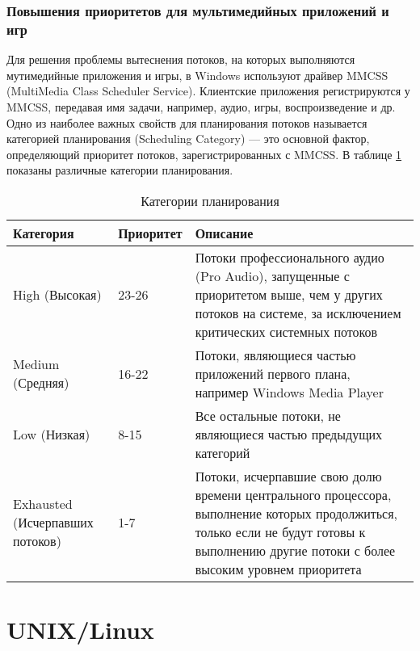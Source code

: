 \subsubsection*{Повышения приоритетов для мультимедийных приложений и игр}

Для решения проблемы вытеснения потоков, на которых выполняются мутимедийные приложения и игры, в Windows используют драйвер MMCSS (MultiMedia Class Scheduler Service). 
Клиентские приложения регистрируются у MMCSS, передавая имя задачи, например, аудио, игры, воспроизведение и др.  
Одно из наиболее важных свойств для планирования потоков называется категорией планирования (Scheduling Category) --- это основной фактор, определяющий приоритет потоков, зарегистрированных с MMCSS.
В таблице \ref{tbl:plan} показаны различные категории планирования.

\begin{table}[ht]
	\begin{center}
		\begin{threeparttable}
			\caption{Категории планирования}
			\label{tbl:plan}
			\begin{tabular}{|p{40mm}|p{30mm}|p{80mm}|}
				\hline
				\bfseries Категория & \bfseries Приоритет & \bfseries Описание \\
				\hline
				High (Высокая) & 23-26 & Потоки профессионального аудио (Pro Audio), запущенные с приоритетом выше, чем у других потоков на системе, за исключением критических системных потоков \\
				\hline
				Medium (Средняя) & 16-22 & Потоки, являющиеся частью приложений первого плана, например Windows Media Player \\
				\hline
				Low (Низкая) & 8-15 & Все остальные потоки, не являющиеся частью предыдущих категорий \\
				\hline
				Exhausted (Исчерпавших потоков) & 1-7 & Потоки, исчерпавшие свою долю времени центрального процессора, выполнение которых продолжиться, только если не будут готовы к выполнению другие потоки с более высоким уровнем приоритета \\
				\hline
			\end{tabular}
		\end{threeparttable}
	\end{center}
\end{table}

\clearpage

\section{UNIX/Linux}

